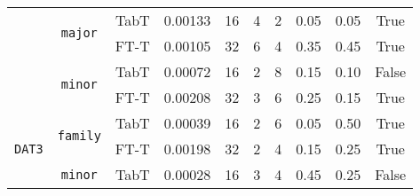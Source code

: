 \begin{table}[]
{\begin{tabular}{cccccccccc}
                                  & \multirow{2}{*}{\texttt{major}}               & TabT                                   & 0.00133                 & 16                      & 4              & 2              & 0.05                   & 0.05                 & True                               \\
                                  &                                      & {\cellcolor{my_grey}}FT-T                                   & {\cellcolor{my_grey}}0.00105                 & {\cellcolor{my_grey}}32                      & {\cellcolor{my_grey}}6              & {\cellcolor{my_grey}}4              & {\cellcolor{my_grey}}0.35                   & {\cellcolor{my_grey}}0.45                 & {\cellcolor{my_grey}}True                               \\
                                  & \multirow{2}{*}{\texttt{minor}}               & TabT                                   & 0.00072                 & 16                      & 2              & 8              & 0.15                   & 0.10                 & False                              \\
                                  &                                      & {\cellcolor{my_grey}}FT-T                                   & {\cellcolor{my_grey}}0.00208                 & {\cellcolor{my_grey}}32                      & {\cellcolor{my_grey}}3              & {\cellcolor{my_grey}}6              & {\cellcolor{my_grey}}0.25                   & {\cellcolor{my_grey}}0.15                 & {\cellcolor{my_grey}}True                               \\ \hline
\multirow{4}{*}{\texttt{DAT3}}             & \multirow{2}{*}{\texttt{family}}              & TabT                                   & 0.00039                 & 16                      & 2              & 6              & 0.05                   & 0.50                 & True                               \\
                                  &                                      & {\cellcolor{my_grey}}FT-T                                   & {\cellcolor{my_grey}}0.00198                 & {\cellcolor{my_grey}}32                      & {\cellcolor{my_grey}}2              & {\cellcolor{my_grey}}4              & {\cellcolor{my_grey}}0.15                   & {\cellcolor{my_grey}}0.25                 & {\cellcolor{my_grey}}True                               \\
                                  & \multirow{2}{*}{\texttt{minor}}               & TabT                                   & 0.00028                 & 16                      & 3              & 4              & 0.45                   & 0.25                 & False                              \\

\end{tabular}}
\end{table}
